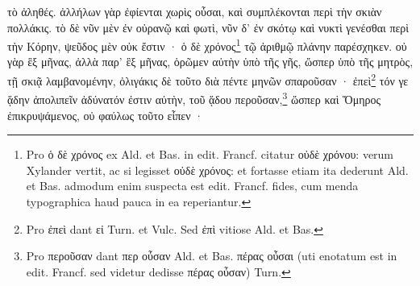 \documentclass[a4paper, 11pt, oneside, polutonikogreek, german]{article}
\begin{document}
τὸ ἀληθές. ἀλλήλων γὰρ ἐφίενται χωρὶς οὖσαι, καὶ συμπλέκονται περὶ τὴν σκιὰν πολλάκις. τὸ δὲ νῦν μὲν ἐν οὐρανῷ καὶ φωτὶ, νῦν δ' ἐν σκότῳ καὶ νυκτὶ γενέσθαι περὶ τὴν Κόρην, ψεῦδος μὲν οὐκ ἔστιν · ὁ δὲ χρόνος\footnote{Pro ὁ δὲ χρόνος ex Ald. et Bas. in edit. Francf. citatur οὐδὲ χρόνου: verum Xylander vertit, ac si legisset οὐδὲ χρόνος: et fortasse etiam ita dederunt Ald. et Bas. admodum enim suspecta est edit. Francf. fides, cum menda typographica haud pauca in ea reperiantur.} τῷ ἀριθμῷ πλάνην παρέσχηκεν. οὐ γὰρ ἓξ μῆνας, ἀλλὰ παρ' ἓξ μῆνας, ὁρῶμεν αὐτὴν ὑπὸ τῆς γῆς, ὥσπερ ὑπὸ τῆς μητρὸς, τῇ σκιᾷ λαμβανομένην, ὀλιγάκις δὲ τοῦτο διὰ πέντε μηνῶν σπαροῦσαν · ἐπεὶ\footnote{Pro ἐπεὶ dant εἰ Turn. et Vulc. Sed ἐπὶ vitiose Ald. et Bas.} τόν γε ᾅδην ἀπολιπεῖν ἀδύνατόν ἐστιν αὐτὴν, τοῦ ᾅδου περοῦσαν,\footnote{Pro περοῦσαν dant περ οὖσαν Ald. et Bas. πέρας οὖσαι (uti enotatum est in edit. Francf. sed videtur dedisse πέρας οὖσαν) Turn.} ὥσπερ καὶ Ὅμηρος ἐπικρυψάμενος, οὐ φαύλως τοῦτο εἶπεν ·
\end{document}
